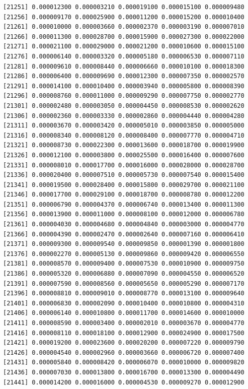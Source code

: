 \documentclass[]{article}
\begin{document}
\begin{verbatim}
[21251] 0.000012300 0.000003210 0.000019100 0.000015100 0.000009480
[21256] 0.000009170 0.000025900 0.000011200 0.000015200 0.000010400
[21261] 0.000010000 0.000003660 0.000002370 0.000003190 0.000007010
[21266] 0.000011300 0.000028700 0.000015900 0.000027300 0.000022000
[21271] 0.000021100 0.000029000 0.000021200 0.000010600 0.000015100
[21276] 0.000006140 0.000003320 0.000005180 0.000006530 0.000007110
[21281] 0.000009610 0.000008440 0.000006660 0.000010100 0.000018300
[21286] 0.000006400 0.000009690 0.000012300 0.000007350 0.000002570
[21291] 0.000014100 0.000010400 0.000003940 0.000005800 0.000008390
[21296] 0.000008760 0.000011000 0.000009290 0.000007750 0.000002770
[21301] 0.000002480 0.000003050 0.000004450 0.000008530 0.000002620
[21306] 0.000002360 0.000003330 0.000002860 0.000004440 0.000004280
[21311] 0.000003670 0.000003420 0.000005010 0.000003850 0.000005000
[21316] 0.000008340 0.000008120 0.000008400 0.000007770 0.000004710
[21321] 0.000008730 0.000022300 0.000013600 0.000018700 0.000019900
[21326] 0.000012100 0.000003800 0.000025500 0.000016400 0.000007600
[21331] 0.000008010 0.000017700 0.000016000 0.000028000 0.000028700
[21336] 0.000020400 0.000007510 0.000005730 0.000007540 0.000015400
[21341] 0.000019500 0.000028400 0.000015800 0.000029700 0.000021100
[21346] 0.000017700 0.000029100 0.000018700 0.000008780 0.000012200
[21351] 0.000006790 0.000004370 0.000006740 0.000013400 0.000011300
[21356] 0.000013900 0.000011000 0.000008100 0.000012000 0.000006780
[21361] 0.000004030 0.000004680 0.000004840 0.000003000 0.000004770
[21366] 0.000004390 0.000002470 0.000002640 0.000007160 0.000006410
[21371] 0.000009300 0.000009540 0.000009850 0.000001390 0.000001800
[21376] 0.000002270 0.000005130 0.000009860 0.000009420 0.000006550
[21381] 0.000008570 0.000009400 0.000007530 0.000010900 0.000009750
[21386] 0.000005320 0.000006880 0.000007090 0.000004550 0.000006520
[21391] 0.000007590 0.000008560 0.000005650 0.000005290 0.000007170
[21396] 0.000008810 0.000009010 0.000008770 0.000013100 0.000009640
[21401] 0.000006830 0.000002090 0.000010400 0.000010800 0.000004310
[21406] 0.000006140 0.000010800 0.000011700 0.000014600 0.000010000
[21411] 0.000008590 0.000003400 0.000002010 0.000003670 0.000004770
[21416] 0.000008110 0.000018100 0.000012900 0.000024900 0.000017500
[21421] 0.000019200 0.000023600 0.000020200 0.000007220 0.000009790
[21426] 0.000004540 0.000002960 0.000003660 0.000006720 0.000007400
[21431] 0.000005840 0.000008420 0.000006070 0.000010000 0.000009820
[21436] 0.000007030 0.000013800 0.000016700 0.000013300 0.000004490
[21441] 0.000014200 0.000016000 0.000004530 0.000009270 0.000012900

\end{verbatim}
\end{document}
